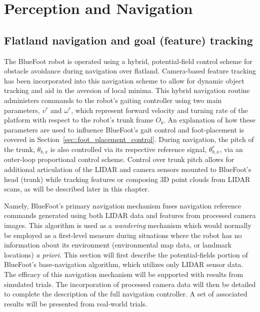 \chapter{Perception and Navigation}
\label{ch::navigation}


	\section{Flatland navigation and goal (feature) tracking}
	
		The BlueFoot robot is operated using a hybrid, potential-field control scheme for obstacle avoidance during navigation over flatland. Camera-based feature tracking has been incorporated into this navigation scheme to allow for dynamic object tracking and aid in the aversion of local minima. This hybrid navigation routine administers commands to the robot's gaiting controller using two main parameters, $v^{r}$ and $\omega^{r}$, which represent forward velocity and turning rate of the platform with respect to the robot's trunk frame $O_{b}$. An explanation of how these parameters are used to influence BlueFoot's gait control and foot-placement is covered in Section~\ref{sec::foot_placement_control}. During navigation, the pitch of the trunk, $\theta_{b,x}$ is also controlled via its respective reference signal, $\theta_{b,x}^{r}$, via an outer-loop proportional control scheme. Control over trunk pitch allows for additional articulation of the LIDAR and camera sensors mounted to BlueFoot's head (trunk) while tracking features or composing 3D point clouds from LIDAR scans, as will be described later in this chapter.

		Namely, BlueFoot's primary navigation mechanism fuses navigation reference commands generated using both LIDAR data and features from processed camera images. This algorithm is used as a \emph{wandering} mechanism which would normally be employed as a first-level measure during situations where the robot has no information about its environment (\IE environmental map data, or landmark locations) \emph{a priori}. This section will first describe the potential-fields portion of BlueFoot's base-navigation algorithm, which utilizes only LIDAR sensor data. The efficacy of this navigation mechanism will be supported with results from simulated trials. The incorporation of processed camera data will then be detailed to complete the description of the full navigation controller. A set of associated results will be presented from real-world trials.


